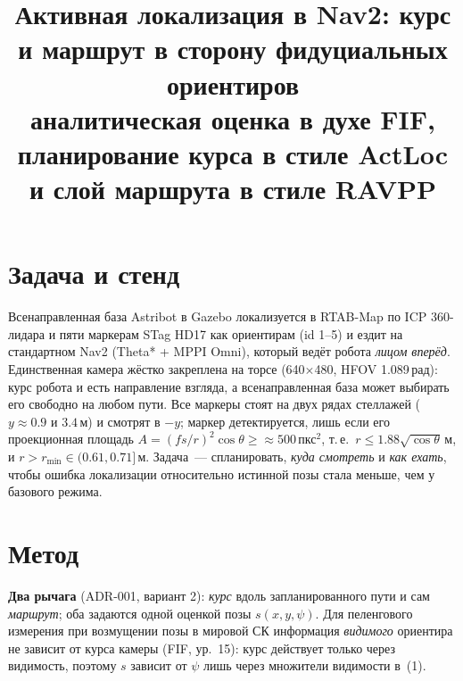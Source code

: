\documentclass[10pt,twocolumn]{article}
\title{\vspace{-1.2cm}\large\bfseries Активная локализация в Nav2: курс и маршрут в сторону фидуциальных ориентиров\\[-2pt]
  {\normalsize\mdseries аналитическая оценка в духе FIF, планирование курса в стиле ActLoc и слой маршрута в стиле RAVPP}\vspace{-0.3cm}}
\author{\small \TODO{авторы, организация, дата, ссылка на репозиторий; подтвердить подзаголовок (DIR)}}
\date{\vspace{-0.9cm}}
\begin{document}
\maketitle

\section{Задача и стенд}
Всенаправленная база Astribot в Gazebo локализуется в RTAB-Map по ICP 360\textdegree-лидара и пяти маркерам STag HD17 как ориентирам (id 1--5) и ездит на стандартном Nav2 (Theta* + MPPI Omni), который ведёт робота \emph{лицом вперёд}.
Единственная камера жёстко закреплена на торсе (640$\times$480, HFOV 1.089\,рад): курс робота и есть направление взгляда, а всенаправленная база может выбирать его свободно на любом пути.
Все маркеры стоят на двух рядах стеллажей ($y\approx0.9$ и $3.4$\,м) и смотрят в $-y$; маркер детектируется, лишь если его проекционная площадь $A=(fs/r)^2\cos\theta\ge{\approx}500$\,пкс$^2$, т.\,е.\ $r\le 1.88\sqrt{\cos\theta}$\,м, и $r>r_{\min}\in(0.61,0.71]$\,м.
Задача~--- спланировать, \emph{куда смотреть} и \emph{как ехать}, чтобы ошибка локализации относительно истинной позы стала меньше, чем у базового режима.

\section{Метод}
\textbf{Два рычага} (ADR-001, вариант 2): \emph{курс} вдоль запланированного пути и сам \emph{маршрут}; оба задаются одной оценкой позы $s(x,y,\psi)$.
Для пеленгового измерения при возмущении позы в мировой СК информация \emph{видимого} ориентира не зависит от курса камеры (FIF, ур.~15): курс действует только через видимость, поэтому $s$ зависит от $\psi$ лишь через множители видимости в~(1).
\end{document}
